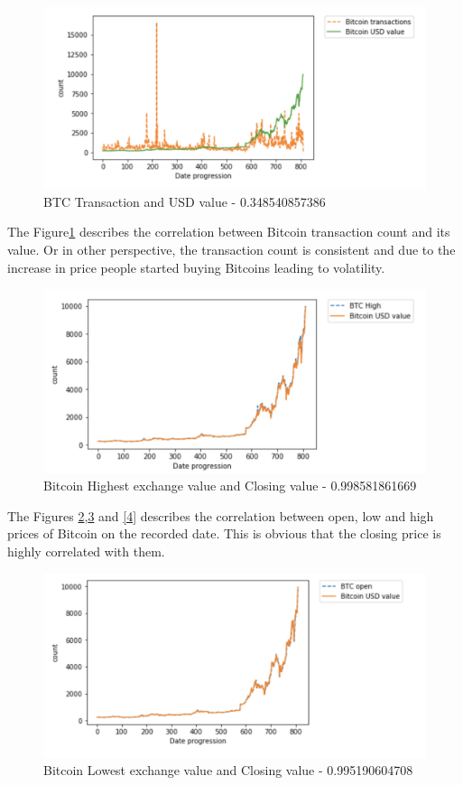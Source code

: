 \documentclass[sigconf]{acmart}
\begin{document}
\begin{figure}[!ht]
  \centering\includegraphics[width=\columnwidth]{PROJECT/images/BTC-prcvsBTC-trans.png}
  \caption{BTC Transaction and USD value - 0.348540857386 }
  \label{1}
\end{figure}

The Figure\ref{1} describes the correlation between Bitcoin transaction count and its value. Or in other perspective, the transaction count is consistent and due to the increase in price people started buying Bitcoins leading to volatility.

\begin{figure}[!ht]
  \centering\includegraphics[width=\columnwidth]{PROJECT/images/High.png}
  \caption{Bitcoin Highest exchange value and Closing value - 0.998581861669  }
  \label{2}
\end{figure}

The Figures \ref{2},\ref{3} and \ref{4} describes the correlation between open, low and high prices of Bitcoin on the recorded date. This is obvious that the closing price is highly correlated with them.

\begin{figure}[!ht]
  \centering\includegraphics[width=\columnwidth]{PROJECT/images/Open.png}
  \caption{Bitcoin Lowest exchange value and Closing value - 0.995190604708  }
  \label{3}
\end{figure}
\end{document}
